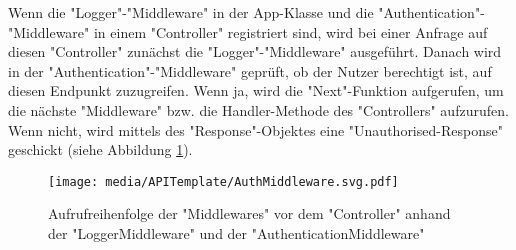 Wenn die "Logger"-"Middleware" in der App-Klasse und die "Authentication"-"Middleware" in einem "Controller" registriert sind, wird bei einer Anfrage auf diesen "Controller" zunächst die "Logger"-"Middleware" ausgeführt. Danach wird in der "Authentication"-"Middleware" geprüft, ob der Nutzer berechtigt ist, auf diesen Endpunkt zuzugreifen. Wenn ja, wird die "Next"-Funktion aufgerufen, um die nächste "Middleware" bzw. die Handler-Methode des "Controllers" aufzurufen. Wenn nicht, wird mittels des "Response"-Objektes eine "Unauthorised-Response" geschickt (siehe Abbildung \ref{fig:authMiddleware}).

\begin{figure}[H]
    \centering
    \texttt{[image: media/APITemplate/AuthMiddleware.svg.pdf]}
    \caption{Aufrufreihenfolge der "Middlewares" vor dem "Controller" anhand der "LoggerMiddleware" und der "AuthenticationMiddleware" } 
    \label{fig:authMiddleware}
\end{figure}

